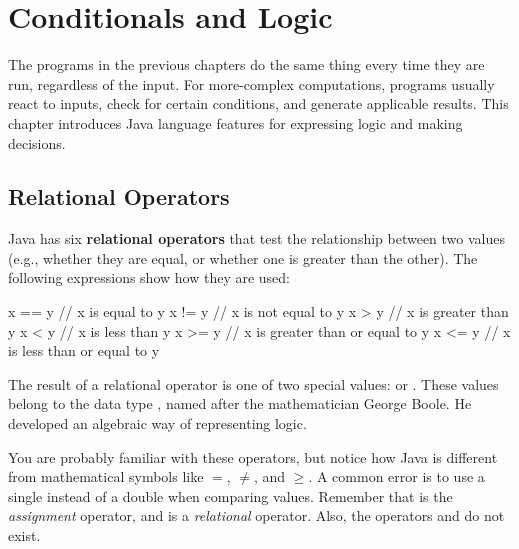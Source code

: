 \chapter{Conditionals and Logic}


The programs in the previous chapters do the same thing every time they are run, regardless of the input.
For more-complex computations, programs usually react to inputs, check for certain conditions, and generate applicable results.
This chapter introduces Java language features for expressing logic and making decisions.


\section{Relational Operators}


Java has six {\bf relational operators} that test the relationship between two values (e.g., whether they are equal, or whether one is greater than the other).
The following expressions show how they are used:

\begin{code}
x == y          // x is equal to y
x != y          // x is not equal to y
x > y           // x is greater than y
x < y           // x is less than y
x >= y          // x is greater than or equal to y
x <= y          // x is less than or equal to y
\end{code}


The result of a relational operator is one of two special values:  or .
These values belong to the data type , named after the mathematician George Boole.
He developed an algebraic way of representing logic.


You are probably familiar with these operators, but notice how Java is different from mathematical symbols like $=$, $\neq$, and $\geq$.
A common error is to use a single \java{=} instead of a double \java{==} when comparing values.
Remember that \java{=} is the {\em assignment} operator, and \java{==} is a {\em relational} operator.
Also, the operators \java{=<} and \java{=>} do not exist.



